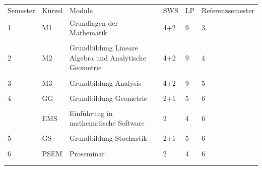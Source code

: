 \begin{center}
\begin{tabular}{||l||l|l|l|l|l||}
\hhline{|t:=:t:=====:t|} Semester\hspace*{4mm}
    &Kürzel
    &Module\hspace*{5ex}
    &SWS\hspace*{6ex}
    &LP\hspace*{4ex}
    &Referenzsemester\hspace*{4ex} \\
\hhline{||=::=====||} 1&M1&Grundlagen der Mathematik&4+2&9&3\\
\hhline{||~||~|~|~|~|~||} &&&&&\\
\hhline{||=::=====||} 2&M2&Grundbildung Lineare Algebra und Analytische Geometrie&4+2&9&4\\
\hhline{||~||~|~|~|~|~||} &&&&&\\
\hhline{||=::=====||} 3&M3&Grundbildung Analysis&4+2&9&5\\
\hhline{||~||~|~|~|~|~||} &&&&&\\
\hhline{||=::=====||} 4&GG&Grundbildung Geometrie&2+1&5&6\\
\hhline{||~||~|~|~|~|~||} &&&&&\\
\hhline{||~||~|~|~|~|~||} &EMS&Einführung in mathematische Software&2&4&6\\
\hhline{||~||~|~|~|~|~||} &&&&&\\
\hhline{||=::=====||} 5&GS&Grundbildung Stochastik&2+1&5&6\\
\hhline{||~||~|~|~|~|~||} &&&&&\\
\hhline{||=::=====||} 6&PSEM&Proseminar&2&4&6\\
\hhline{||~||~|~|~|~|~||} &&&&&\\
\hhline{|b:=:b:=====:b|}
\end{tabular}
\end{center}
\clearpage

